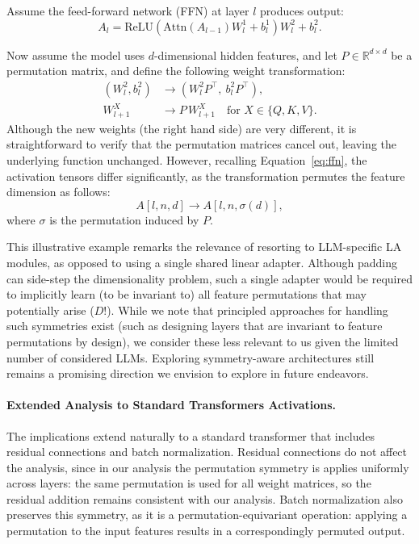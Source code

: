 Assume the feed-forward network (FFN) at layer $l$ produces output:
\begin{equation}
A_l = \mathrm{ReLU}(\mathrm{Attn}(A_{l-1}) W_l^1 + b_l^1) W_l^2 + b_l^2.
\label{eq:ffn}
\end{equation}

Now assume the model uses $d$-dimensional hidden features, and let $P \in \mathbb{R}^{d \times d}$ be a permutation
matrix, and define the following weight transformation:
\begin{align}
(W_l^2, b_l^2) &\to (W_l^2 P^\top,\ b_l^2 P^\top), \\
W_{l+1}^{X} &\to P\, W_{l+1}^{X} \quad \text{for } X \in \{Q, K, V\}.
\end{align}
Although the new weights (the right hand side) are very different, it is straightforward to verify that
the permutation matrices cancel out, leaving the underlying function unchanged. However, recalling
Equation~\eqref{eq:ffn}, the activation tensors differ significantly, as the transformation permutes the feature
dimension as follows:
\begin{equation}
A[l, n, d] \to A[l, n, \sigma(d)],
\end{equation}
where $\sigma$ is the permutation induced by $P$.

This illustrative example remarks the relevance of resorting to LLM-specific LA modules, as opposed to using a single shared linear adapter. Although padding can side-step the dimensionality
problem, such a single adapter would be required to implicitly learn (to be invariant to) all feature
permutations that may potentially arise ($D!$). While we note that principled approaches for handling
such symmetries exist (such as designing layers that are invariant to feature permutations by design),
we consider these less relevant to us given the limited number of considered LLMs. Exploring
symmetry-aware architectures still remains a promising direction we envision to explore in future
endeavors.

\paragraph{Extended Analysis to Standard Transformers Activations.} The implications extend naturally
to a standard transformer that includes residual connections and batch normalization. Residual
connections do not affect the analysis, since in our analysis the permutation symmetry is applies
uniformly across layers: the same permutation is used for all weight matrices, so the residual
addition remains consistent with our analysis. Batch normalization also preserves this symmetry, as
it is a permutation-equivariant operation: applying a permutation to the input features results in a
correspondingly permuted output.

